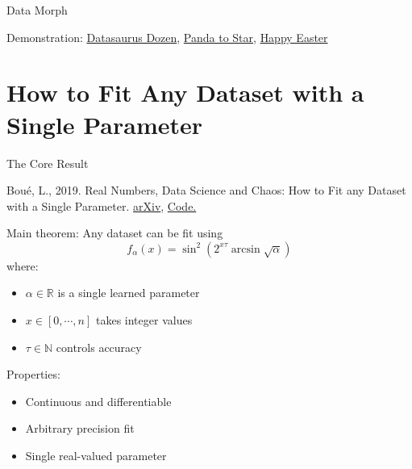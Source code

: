 \documentclass[10pt]{beamer}
\begin{document}
\begin{frame}{Data Morph}
  \begin{center}
    Demonstration: \href{https://www.research.autodesk.com/app/uploads/2023/03/DinoSequential-1.gif}{Datasaurus Dozen}, \href{https://stefaniemolin.com/assets/articles/data-science/introducing-data-morph/panda-to-star.gif}{Panda to Star}, \href{https://twitter.com/StefanieMolin/status/1645046652971933696}{Happy Easter}
  \end{center}
\end{frame}

\section{How to Fit Any Dataset with a Single Parameter}

\begin{frame}{The Core Result}

Boué, L., 2019. Real Numbers, Data Science and Chaos: How to Fit any Dataset with a Single Parameter. \href{https://arxiv.org/abs/1904.12320}{arXiv}, \href{https://github.com/Ranlot/single-parameter-fit}{Code.}
\vspace{5mm}

Main theorem: Any dataset can be fit using
\[ f_\alpha(x) = \sin^2(2^{x\tau} \arcsin\sqrt{\alpha}) \]
where:
\begin{itemize}
\item $\alpha \in \mathbb{R}$ is a single learned parameter
\item $x \in [0,\cdots,n]$ takes integer values
\item $\tau \in \mathbb{N}$ controls accuracy
\end{itemize}

Properties:
\begin{itemize}
\item Continuous and differentiable
\item Arbitrary precision fit
\item Single real-valued parameter
\end{itemize}
\end{frame}
\end{document}
